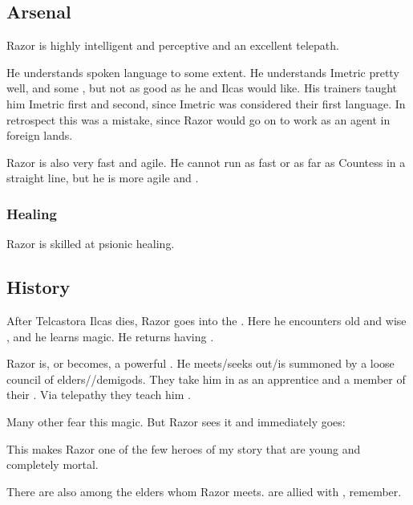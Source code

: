 \subsection{Arsenal}
Razor is highly intelligent and perceptive and an excellent telepath. 

He understands spoken language to some extent. 
He understands Imetric pretty well, and some \Velcadian, but not as good as he and Ilcas would like. 
His trainers taught him Imetric first and \Velcadian{} second, since Imetric was considered their first language. 
In retrospect this was a mistake, since Razor would go on to work as an agent in foreign lands. 

Razor is also very fast and agile. 
He cannot run as fast or as far as Countess in a straight line, but he is more agile and \manoeuvrable. 





\subsubsection{Healing}
Razor is skilled at psionic healing. 









\subsection{History}
After Telcastora Ilcas dies, Razor goes into the \Wylde{}. 
Here he encounters old and wise \nycans, and he learns magic. 
He returns having . 

Razor is, or becomes, a powerful \vertex. 
He meets/seeks out/is summoned by a loose council of \nycan{} elders/\vertices/demigods. 
They take him in as an apprentice and a member of their \matrixx. 
Via telepathy they teach him . 

Many other \nycans{} fear this magic. 
But Razor sees it and immediately goes: 

This makes Razor one of the few heroes of my story that are young and completely mortal. 

There are also \cuezcans{} among the elders whom Razor meets. 
\Cuezcans{} are allied with \nycans, remember. 















